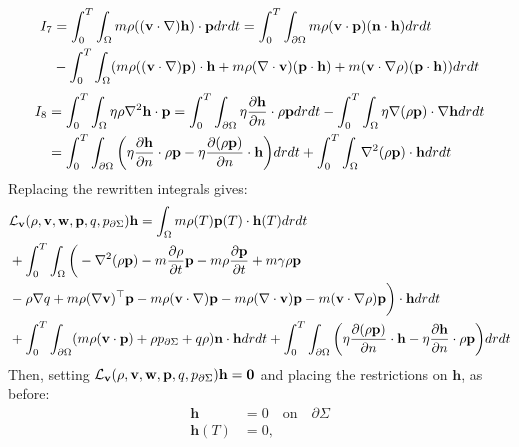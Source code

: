 \begin{align*}
I_7&=\int_0^T \int_\Omega m \rho ((\mathbf{v} \cdot \nabla)\mathbf{h}) \cdot \mathbf{p} dr dt
= \int_0^T \int_{\partial \Omega} m \rho (\mathbf{v} \cdot \mathbf{p})(\mathbf{n} \cdot \mathbf{h})dr dt \\
&- \int_0^T \int_\Omega (m \rho ((\mathbf{v} \cdot \nabla)\mathbf{p})\cdot \mathbf{h} + m \rho (\nabla \cdot \mathbf{v})(\mathbf{p} \cdot \mathbf{h}) + m (\mathbf{v} \cdot \nabla \rho)(\mathbf{p} \cdot \mathbf{h}))drdt
\end{align*}
\begin{align*}
I_8 &= \int_0^T \int_\Omega \eta \rho \nabla^2 \mathbf{h} \cdot \mathbf{p} = \int_0^T \int_{\partial \Omega} \eta \frac{\partial \mathbf{h}}{\partial n}  \cdot \rho \mathbf{p} dr dt - \int_0^T \int_\Omega \eta \nabla (\rho \mathbf{p}) \cdot \nabla\mathbf{h} dr dt\\
& = \int_0^T \int_{\partial \Omega} \bigg( \eta \frac{\partial \mathbf{h}}{\partial n} \cdot \rho \mathbf{p}  - \eta \frac{\partial (\rho \mathbf{p})}{\partial n} \cdot \mathbf{h}  \bigg)dr dt + \int_0^T \int_\Omega \nabla^2 (\rho \mathbf{p}) \cdot \mathbf{h} dr dt
\end{align*}
Replacing the rewritten integrals gives:
\begin{align*}
&\mathcal{L}_{\mathbf{v}}(\rho,\mathbf{v},\mathbf{w},\mathbf{p},q,{p}_{\partial \Sigma}) \mathbf{h} = \int_\Omega m \rho(T) \mathbf{p}(T) \cdot \mathbf{h}(T) dr dt\\
&+\int_0^T \int_\Omega 
\bigg( -\nabla^2 (\rho \mathbf{p}) - m \frac{\partial \rho}{\partial t} \mathbf{p}  -  m\rho \frac{\partial \mathbf{p}}{\partial t} +m \gamma \rho \mathbf{p}\\
&-\rho\nabla q +m \rho (\nabla \mathbf{v})^\top\mathbf{p} 
-m \rho (\mathbf{v} \cdot \nabla)\mathbf{p} - m \rho (\nabla \cdot \mathbf{v})\mathbf{p}  - m (\mathbf{v} \cdot \nabla \rho)\mathbf{p}  \bigg)\cdot  \mathbf{h} drdt\\
& +\int_0^T \int_{\partial\Omega} ( m \rho (\mathbf{v} \cdot \mathbf{p})+\rho  {p}_{\partial \Sigma} + q \rho)  \mathbf{n}\cdot \mathbf{h} dr dt + \int_0^T \int_{\partial \Omega} \bigg(\eta \frac{\partial (\rho \mathbf{p})}{\partial n} \cdot \mathbf{h} - \eta \frac{\partial \mathbf{h}}{\partial n} \cdot \rho \mathbf{p}    \bigg)dr dt\\
\end{align*}
Then, setting $\mathcal{L}_{\mathbf{v}}(\rho,\mathbf{v},\mathbf{w},\mathbf{p},q,{p}_{\partial \Sigma}) \mathbf{h}=\mathbf{0}$ and placing the restrictions on $\mathbf{h}$, as before:
\begin{align*}
\mathbf{h}&=0 \quad \text{on} \quad \partial \Sigma\\
\mathbf{h}(T)&=0,
\end{align*}
